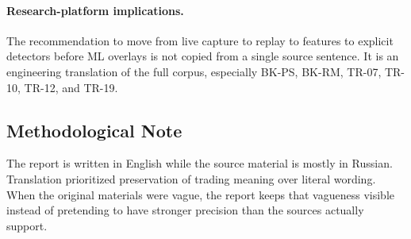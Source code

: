 \paragraph{Research-platform implications.}
The recommendation to move from live capture to replay to features to explicit detectors before ML overlays is not copied from a single source sentence. It is an engineering translation of the full corpus, especially BK-PS, BK-RM, TR-07, TR-10, TR-12, and TR-19.

\subsection{Methodological Note}

The report is written in English while the source material is mostly in Russian.
Translation prioritized preservation of trading meaning over literal wording.
When the original materials were vague, the report keeps that vagueness visible instead of pretending to have stronger precision than the sources actually support.
